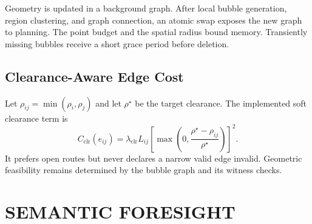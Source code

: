 \documentclass[letterpaper,10pt,conference]{ieeeconf}
\begin{document}
Geometry is updated in a background graph. After local bubble generation,
region clustering, and graph connection, an atomic swap exposes the new
graph to planning. The point budget and the spatial radius bound memory.
Transiently missing bubbles receive a short grace period before deletion.

\subsection{Clearance-Aware Edge Cost}
Let $\rho_{ij}=\min(\rho_i,\rho_j)$ and let $\rho^\star$ be the target
clearance.
The implemented soft clearance term is
\begin{equation}
 C_{\mathrm{clr}}(e_{ij})=
 \lambda_{\mathrm{clr}}L_{ij}
 \left[
 \max\left(0,\frac{\rho^\star-\rho_{ij}}{\rho^\star}\right)
 \right]^2.
\label{eq:clearance}
\end{equation}
It prefers open routes but never declares a narrow valid edge invalid.
Geometric feasibility remains determined by the bubble graph and its witness
checks.

\section{SEMANTIC FORESIGHT}
\label{sec:semantics}
\end{document}

